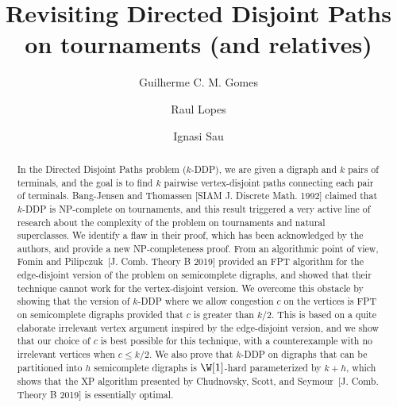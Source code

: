 \documentclass[a4paper,UKenglish,cleveref, autoref, thm-restate]{lipics-v2021}
\title{Revisiting Directed Disjoint Paths on tournaments (and relatives)}
\author{Guilherme C. M. Gomes}{LIRMM, Université de Montpellier, CNRS, Montpellier,
France\\
Universidade Federal de Minas Gerais, Belo Horizonte, Brazil}{gcm.gomes@dcc.ufmg.br}{ttps://orcid.org/0000-0002-7487-3475}{Funded by the European Union, project PACKENUM, grant number 101109317. Views and opinions expressed are however those of the author only and do not necessarily reflect those of the European Union. Neither the European Union nor the granting authority can be held responsible for them.}
\author{Raul Lopes}{LIRMM, Université de Montpellier, CNRS, Montpellier,
France\\
Hamburg University of Technology, Institute for Algorithms and Complexity, Hamburg, Germany}{rtlopes@protonmail.com}{https://orcid.org/0000-0002-7487-3475}{French project ELIT (ANR-20-CE48-0008-01) and HIDSS-0002 DASHH (Data Science in Hamburg - Helmholtz Graduate School for the Structure of Matter).}
\author{Ignasi Sau}{LIRMM, Université de Montpellier, CNRS, Montpellier,
France}{ignasi.sau@lirmm.fr}{https://orcid.org/0000-0002-8981-9287}{French project ELIT (ANR-20-CE48-0008-01).}
\renewcommand{\NP}{{\sf NP}\xspace}
\renewcommand{\FPT}{{\sf FPT}\xspace}
\renewcommand{\XP}{{\sf XP}\xspace}
\begin{document}
\maketitle

\begin{abstract}
  In the {\sc Directed Disjoint Paths} problem ($k$-{\sc DDP}), we are given a digraph
  and $k$ pairs of terminals, and the goal is to find $k$ pairwise vertex-disjoint paths
  connecting each pair of terminals. Bang-Jensen and Thomassen [SIAM J. Discrete Math.
  1992] claimed that $k$-{\sc DDP} is \NP-complete on tournaments, and this result
  triggered a very active line of research about the complexity of the problem on
  tournaments and natural superclasses. We identify a flaw in their proof, which has been
  acknowledged by the authors, and provide a new \NP-completeness proof. From an
  algorithmic point of view, Fomin and Pilipczuk~[J. Comb. Theory B 2019] provided an
  \FPT algorithm for the edge-disjoint version of the problem on semicomplete digraphs,
  and showed that their technique cannot work for the vertex-disjoint version. We
  overcome this obstacle by showing that the version of $k$-{\sc DDP} where we allow
  congestion $c$ on the vertices is \FPT on semicomplete digraphs provided that $c$ is
  greater than $k/2$. This is based on a quite elaborate irrelevant vertex argument inspired by the edge-disjoint version, and we show that our choice of $c$ is best possible for this technique, with a counterexample with no irrelevant vertices when $c \leq k/2$. We also prove that $k$-{\sc DDP} on digraphs that can be
  partitioned into $h$ semicomplete digraphs is $\W[1]$-hard parameterized by $k+h$,
  which shows that the \XP algorithm presented by Chudnovsky, Scott, and Seymour~[J.
  Comb. Theory B 2019] is essentially optimal.
\end{abstract}
\end{document}
